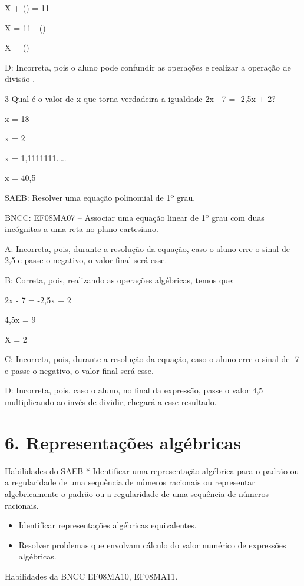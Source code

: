 {X + () = 11

X = 11 - ()

X = ()

D: Incorreta, pois o aluno pode confundir as operações e realizar a
operação de divisão .

\num{3} Qual é o valor de x que torna verdadeira a igualdade 2x - 7 = -2,5x +
2?
\item x = 18
\item x = 2
\item x = 1,1111111.\ldots.
\item x = 40,5

SAEB: Resolver uma equação polinomial de 1º grau.

BNCC: EF08MA07 -- Associar uma equação linear de 1º grau com duas
incógnitas a uma reta no plano cartesiano.

A: Incorreta, pois, durante a resolução da equação, caso o aluno erre o
sinal de 2,5 e passe o negativo, o valor final será esse.

B: Correta, pois, realizando as operações algébricas, temos que:

2x - 7 = -2,5x + 2

4,5x = 9

X = 2

C: Incorreta, pois, durante a resolução da equação, caso o aluno erre o
sinal de -7 e passe o negativo, o valor final será esse.

D: Incorreta, pois, caso o aluno, no final da expressão, passe o valor
4,5 multiplicando ao invés de dividir, chegará a esse resultado.


\section{6. Representações
algébricas}

Habilidades do SAEB * Identificar uma representação algébrica para o
padrão ou a regularidade de uma sequência de números racionais ou
representar algebricamente o padrão ou a regularidade de uma sequência
de números racionais.

\begin{itemize}
\item
  Identificar representações algébricas equivalentes.
\item
  Resolver problemas que envolvam cálculo do valor numérico de
  expressões algébricas.
\end{itemize}

Habilidades da BNCC EF08MA10, EF08MA11.

}
